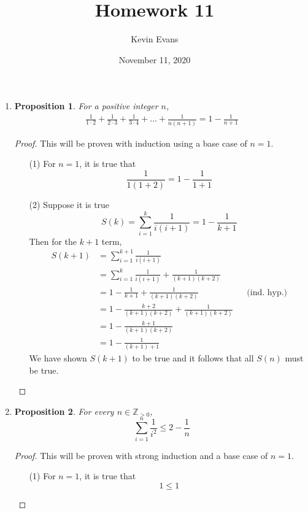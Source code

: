 \documentclass{homework}
\title{Homework 11}
\author{Kevin Evans}
\date{November 11, 2020}
\newtheorem*{prop}{Proposition}
\begin{document}
	\maketitle
	
	\begin{enumerate}
		\item \begin{minipage}[t]{\linewidth}
			\begin{prop}
				For a positive integer $n$, \begin{align*}
					\frac{1}{1 \cdot 2} + \frac{1}{2 \cdot 3} + \frac{1}{3 \cdot 4} + \dots + \frac{1}{n(n+1)} = 1 - \frac{1}{n+1}
				\end{align*}
			\end{prop}
			\begin{proof} This will be proven with induction using a base case of $n=1$.
				\begin{enumerate}
					\item[(1)] For $n=1$, it is true that \[\frac{1}{1(1+2)} = 1 - \frac{1}{1+1} \]
					\item[(2)] Suppose it is true $$S(k) = \sum_{i=1}^k \frac{1}{i(i+1)} = 1 - \frac{1}{k+1}$$
					Then for the $k+1$ term, \begin{align*}
						S(k+1) & = \sum_{i=1}^{k+1} \frac{1}{i(i+1)} \\
							& = \sum_{i=1}^k \frac{1}{i(i+1)} + \frac{1}{(k+1)(k+2)} \\
							& = 1 - \frac{1}{k+1} + \frac{1}{(k+1)(k+2)} && \text{(ind. hyp.)}\\
							& = 1 - \frac{k+2}{(k+1)(k+2)} + \frac{1}{(k+1)(k+2)} \\
							& = 1 - \frac{k+1}{(k+1)(k+2)} \\
							& = 1 - \frac{1}{(k+1) + 1}
					\end{align*}
					We have shown $S(k+1)$ to be true and it follows that all $S(n)$ must be true.
				\end{enumerate}
			\end{proof}
		\end{minipage}
	
		\item \begin{minipage}[t]{\linewidth}
			\begin{prop} For every $n \in \mathbb{Z}_{>0}$, 
					$$\sum_{i=1}^n \frac{1}{i^2} \le 2 - \frac{1}{n}$$
			\end{prop}
			\begin{proof} This will be proven with strong induction and a base case of $n=1$.
				\begin{enumerate}
					\item[(1)] For $n=1$, it is true that
						$$1 \le 1$$
						

\end{enumerate}
\end{proof}
\end{minipage}
\end{enumerate}
\end{document}
